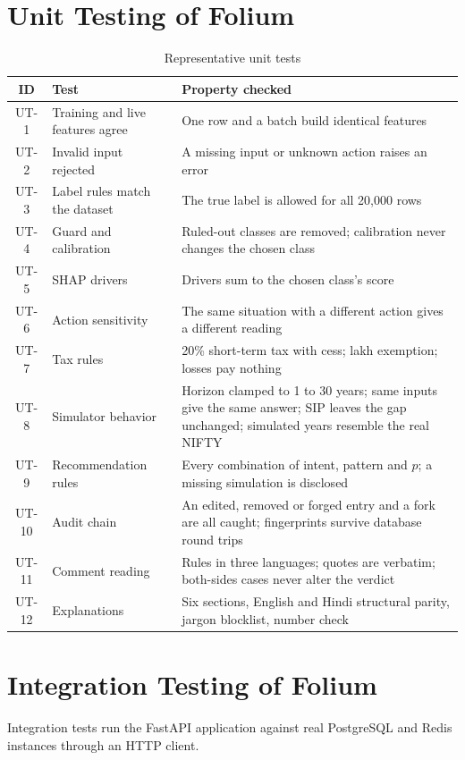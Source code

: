 \section{Unit Testing of Folium}
\begin{table}[H]
\centering
\small
\begin{tabularx}{\textwidth}{|c|P{5.6cm}|L|}
\hline
\textbf{ID} & \textbf{Test} & \textbf{Property checked} \\
\hline
UT-1 & Training and live features agree & One row and a batch build identical features \\
\hline
UT-2 & Invalid input rejected & A missing input or unknown action raises an error \\
\hline
UT-3 & Label rules match the dataset & The true label is allowed for all 20,000 rows \\
\hline
UT-4 & Guard and calibration & Ruled-out classes are removed; calibration never changes the chosen class \\
\hline
UT-5 & SHAP drivers & Drivers sum to the chosen class's score \\
\hline
UT-6 & Action sensitivity & The same situation with a different action gives a different reading \\
\hline
UT-7 & Tax rules & 20\% short-term tax with cess;  lakh exemption; losses pay nothing \\
\hline
UT-8 & Simulator behavior & Horizon clamped to 1 to 30 years; same inputs give the same answer; SIP leaves the gap unchanged; simulated years resemble the real NIFTY \\
\hline
UT-9 & Recommendation rules & Every combination of intent, pattern and $p$; a missing simulation is disclosed \\
\hline
UT-10 & Audit chain & An edited, removed or forged entry and a fork are all caught; fingerprints survive database round trips \\
\hline
UT-11 & Comment reading & Rules in three languages; quotes are verbatim; both-sides cases never alter the verdict \\
\hline
UT-12 & Explanations & Six sections, English and Hindi structural parity, jargon blocklist, number check \\
\hline
\end{tabularx}
\caption{Representative unit tests}
\label{tab:unit}
\end{table}

\section{Integration Testing of Folium}
Integration tests run the FastAPI application against real PostgreSQL and Redis instances through an HTTP client.

